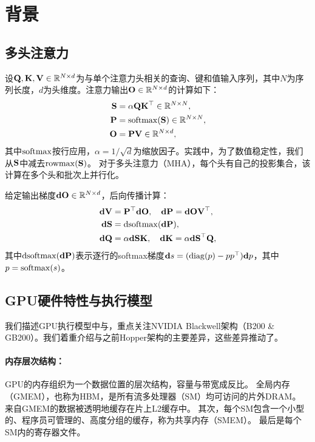 \section{背景}
\label{sec:background}

\subsection{多头注意力}
\label{subsec:multi_head_attn}

设$\mathbf{Q}, \mathbf{K}, \mathbf{V} \in \mathbb{R}^{N \times d}$为与单个注意力头相关的查询、键和值输入序列，其中$N$为序列长度，$d$为头维度。注意力输出$\mathbf{O} \in \mathbb{R}^{N \times d}$的计算如下：
\begin{align*}
  \mathbf{S} &= \alpha \mathbf{Q} \mathbf{K}^\top \in \mathbb{R}^{N \times N}, \\
  \mathbf{P} &= \mathrm{softmax}(\mathbf{S}) \in \mathbb{R}^{N \times N}, \\
  \mathbf{O} &= \mathbf{P}\mathbf{V} \in \mathbb{R}^{N \times d},
\end{align*}
其中$\mathrm{softmax}$按行应用，$\alpha = 1/\sqrt{d}$为缩放因子。实践中，为了数值稳定性，我们从$\mathbf{S}$中减去$\mathrm{rowmax}(\mathbf{S})$。
对于多头注意力（MHA），每个头有自己的投影集合，该计算在多个头和批次上并行化。

给定输出梯度$\mathbf{dO} \in \mathbb{R}^{N \times d}$，后向传播计算：
\begin{align*}
  \mathbf{dV} &= \mathbf{P}^\top \mathbf{dO}, \quad \mathbf{dP} = \mathbf{dO} \mathbf{V}^\top, \\
  \mathbf{dS} &= \mathrm{dsoftmax} (\mathbf{dP}), \\
  \mathbf{dQ} &= \alpha \mathbf{dS} \mathbf{K}, \quad \mathbf{dK} = \alpha \mathbf{dS}^\top \mathbf{Q},
\end{align*}
其中$\mathrm{dsoftmax}(\mathbf{dP})$表示逐行的softmax梯度$\mathbf{d}s = (\mathrm{diag}(p) - p p^\top)\mathbf{d}p$，其中$p = \mathrm{softmax}(s)$。

\subsection{GPU硬件特性与执行模型}
\label{subsec:hardware}

我们描述GPU执行模型中与，重点关注NVIDIA Blackwell架构（B200 \& GB200）。我们着重介绍与之前Hopper架构的主要差异，这些差异推动了。

\paragraph{内存层次结构：}
GPU的内存组织为一个数据位置的层次结构，容量与带宽成反比。
全局内存（GMEM），也称为HBM，是所有流多处理器（SM）均可访问的片外DRAM。
来自GMEM的数据被透明地缓存在片上L2缓存中。
其次，每个SM包含一个小型的、程序员可管理的、高度分组的缓存，称为共享内存（SMEM）。
最后是每个SM内的寄存器文件。

